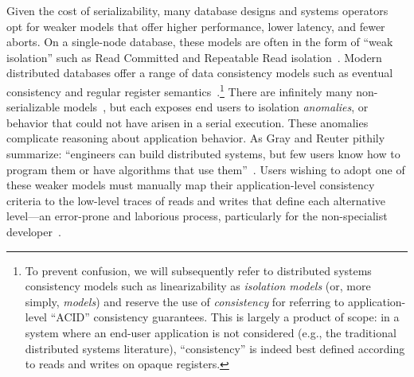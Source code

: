 
Given the cost of serializability, many database designs and systems
operators opt for weaker models that offer higher performance, lower
latency, and fewer aborts. On a single-node database, these models are
often in the form of ``weak isolation'' such as Read Committed and
Repeatable Read isolation~\cite{adya-isolation}. Modern distributed
databases offer a range of data consistency models such as eventual
consistency and regular register
semantics~\cite{hat-vldb}.\footnote{To prevent confusion, we will
  subsequently refer to distributed systems consistency models such as
  linearizability as \textit{isolation models} (or, more simply,
  \textit{models}) and reserve the use of \textit{consistency} for
  referring to application-level ``ACID'' consistency guarantees. This
  is largely a product of scope: in a system where an end-user
  application is not considered (e.g., the traditional distributed
  systems literature), ``consistency'' is indeed best defined
  according to reads and writes on opaque registers.}  There are
infinitely many non-serializable models~\cite{hat-vldb}, but each
exposes end users to isolation \textit{anomalies}, or behavior that
could not have arisen in a serial execution. These anomalies
complicate reasoning about application behavior. As Gray and Reuter
pithily summarize: ``engineers can build distributed systems, but few
users know how to program them or have algorithms that use
them''~\cite{gray-book}. Users wishing to adopt one of these weaker
models must manually map their application-level consistency criteria
to the low-level traces of reads and writes that define each
alternative level---an error-prone and laborious process, particularly
for the non-specialist developer~\cite{consistency-borders}.


